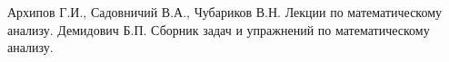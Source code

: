 \begin{thebibliography}{9}
 Архипов Г.И., Садовничий В.А., Чубариков В.Н. Лекции по математическому анализу.
 Демидович Б.П. Сборник задач и упражнений по математическому анализу.
\end{thebibliography}


